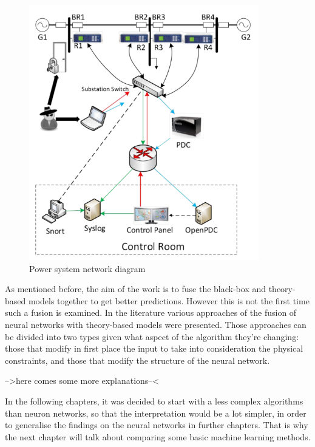 \begin{figure}[H]
    \centering
    \includegraphics[width=100mm]{images/cps_rep.png}
    \caption[Power system network diagram]{Power system network diagram \cite{adhikari_power_2014}}
    \label{fig:cps_rep}
\end{figure}

As mentioned before, the aim of the work is to fuse the black-box and theory-based models together to get better predictions. However this is not the first time such a fusion is examined. In the literature various approaches of the fusion of neural networks with theory-based models were presented. Those approaches can be divided into two types given what aspect of the algorithm they're changing: those that modify in first place the input to take into consideration the physical constraints, and those that modify the structure of the neural network.

-->here comes some more explanations--<

In the following chapters, it was decided to start with a less complex algorithms than neuron networks, so that the interpretation would be a lot simpler, in order to generalise the findings on the neural networks in further chapters. That is why the next chapter will talk about comparing some basic machine learning methods.